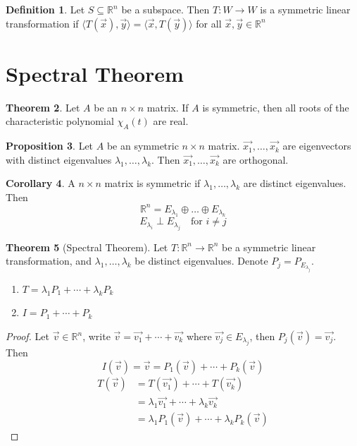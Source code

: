 \documentclass{article}
\theoremstyle{definition}
\newtheorem{theorem}{Theorem}[section]
\newtheorem{corollary}[theorem]{Corollary}
\newtheorem{proposition}[theorem]{Proposition}
\newtheorem{definition}[theorem]{Definition}
\theoremstyle{remark}
\begin{document}
\begin{definition}
    Let $S\subseteq\mathbb{R}^n$ be a subspace.
    Then $T:W\rightarrow W$ is a symmetric linear transformation if $\langle T(\vec{x}),\vec{y}\rangle = \langle \vec{x},T(\vec{y})\rangle$ for all $\vec{x},\vec{y}\in\mathbb{R}^n$
\end{definition}

\section{Spectral Theorem}

\begin{theorem}
    Let $A$ be an $n\times n$ matrix.
    If $A$ is symmetric, then all roots of the characteristic polynomial $\chi_A(t)$ are real.
\end{theorem}

\begin{proposition}
    Let $A$ be an symmetric $n\times n$ matrix.
    $\vec{x_1},\dots,\vec{x_k}$ are eigenvectors with distinct eigenvalues $\lambda_1,\dots,\lambda_k$.
    Then $\vec{x_1},\dots,\vec{x_k}$ are orthogonal.
\end{proposition}

\begin{corollary}
    A $n\times n$ matrix is symmetric if $\lambda_1,\dots ,\lambda_k$ are distinct eigenvalues. Then 
    \[
    \mathbb{R}^n=E_{\lambda_1}\oplus\dots \oplus E_{\lambda_k}
    \]
    \[
    E_{\lambda_i} \perp E_{\lambda_j} \quad\text{for }i\neq j
    \]
\end{corollary}

\begin{theorem}[Spectral Theorem]
Let $T:\mathbb{R}^n\rightarrow \mathbb{R}^n$ be a symmetric linear transformation, and $\lambda_1,\dots ,\lambda_k$ be distinct eigenvalues. 
    Denote $P_j=P_{E_{\lambda_j}}$.
    \begin{enumerate}
        \item $T=\lambda_1 P_1+\cdots+\lambda_k P_k$
        \item $I=P_1+\cdots+P_k$
    \end{enumerate}
\end{theorem}

\begin{proof}
    Let $\vec{v}\in\mathbb{R}^n$, write $\vec{v}=\vec{v_1}+\cdots+\vec{v_k}$ where $\vec{v_j}\in E_{\lambda_j}$, then $P_j(\vec{v})=\vec{v_j}$.
    Then
    \[
    I(\vec{v})=\vec{v}=P_1(\vec{v})+\cdots+P_k(\vec{v})
    \]
    \[
    \begin{aligned}
        T(\vec{v})
        &=T(\vec{v_1})+\cdots +T(\vec{v_k})\\
        &=\lambda_1\vec{v_1}+\cdots+\lambda_k\vec{v_k}\\
        &=\lambda_1P_1(\vec{v})+\cdots+\lambda_kP_k(\vec{v})
    \end{aligned}
    \]
\end{proof}
\end{document}
